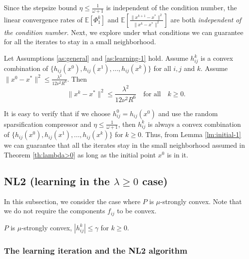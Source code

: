\documentclass[12pt]{article}
\newcommand{\newalpha}{h}
\begin{document}
Since the stepsize bound $\eta \leq \frac{1}{\omega+1}$ is independent of the condition number, the linear convergence rates of $\mathbb{E}[\Phi_1^k]$ and $ \mathbb{E} \left[  \frac{\|x^{k+1} - x^*\|^2}{\|x^k - x^*\|^2 }  \right]$ are both {\em independent of the condition number.} Next, we explore under what conditions we can guarantee for all the iterates to stay in a small neighborhood. 

\begin{lemma}\label{lm:initial-1}
Let Assumptions \ref{as:general} and \ref{as:learning-1} hold. Assume $h_{ij}^k$ is a convex combination of $\{  \newalpha_{ij}(x^0), \newalpha_{ij}(x^1), ..., \newalpha_{ij}(x^k)  \}$ for all $i,j$ and $k$. Assume $\|x^0 - x^*\|^2 \leq \frac{\lambda^2}{12\nu^2R^6}$. Then $$
\|x^k - x^*\|^2 \leq \frac{\lambda^2}{12\nu^2R^6} \quad \text{for all} \quad k\geq 0.
$$ 
\end{lemma}


It is easy to verify that if we choose $h_{ij}^0 = \newalpha_{ij}(x^0)$ and use the random sparsification compressor and $\eta \leq \frac{1}{\omega + 1}$, then $h_{ij}^k$ is always a convex combination of $\{  \newalpha_{ij}(x^0), \newalpha_{ij}(x^1), ..., \newalpha_{ij}(x^k)  \}$ for $k\geq 0$. Thus, from Lemma \ref{lm:initial-1} we can guarantee that all the iterates stay in the small neighborhood assumed in Theorem \ref{th:lambda>0} as long as the initial point $x^0$ is in it.  



\subsection{{\sf NL2} (learning in the $\lambda \geq 0$ case)} \label{subsec:NL2}

In this subsection, we consider the case where $P$ is $\mu$-strongly convex. Note that we do not require the components $f_{ij}$ to be convex. 
\begin{assumption}\label{as:learning-2}
 $P$ is $\mu$-strongly convex, $|h_{ij}^k| \leq \gamma$ for $k\geq 0$. \end{assumption}


\subsubsection{The learning iteration and the {\sf NL2} algorithm}
\end{document}
